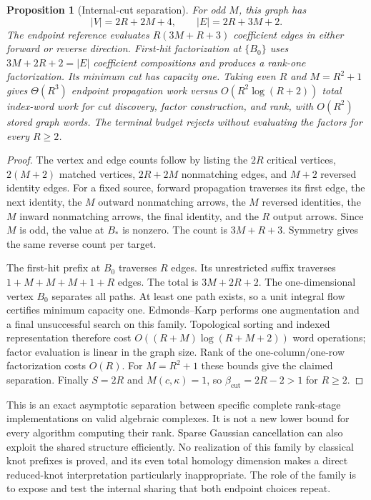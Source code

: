 \documentclass[11pt,letterpaper]{article}
\newtheorem{proposition}[theorem]{Proposition}
\theoremstyle{definition}\newtheorem{definition}[theorem]{Definition}
\theoremstyle{remark}\newtheorem{remark}[theorem]{Remark}
\newcommand{\cutlb}{\beta_{\mathrm{cut}}}
\begin{document}
\begin{proposition}[Internal-cut separation]\label{prop:separation}
For odd $M$, this graph has
\[
 |V|=2R+2M+4,\qquad |E|=2R+3M+2.
\]
The endpoint reference evaluates $R(3M+R+3)$ coefficient edges in either
forward or reverse direction. First-hit factorization at $\{B_0\}$ uses
$3M+2R+2=|E|$ coefficient compositions and produces a rank-one factorization.
Its minimum cut has capacity one. Taking even $R$ and $M=R^2+1$ gives
$\Theta(R^3)$ endpoint propagation work versus $O(R^2\log(R+2))$ total
index-word work for cut discovery, factor construction, and rank, with
$O(R^2)$ stored graph words. The terminal budget rejects without evaluating
the factors for every $R\geq2$.
\end{proposition}
\begin{proof}
The vertex and edge counts follow by listing the $2R$ critical vertices,
$2(M+2)$ matched vertices, $2R+2M$ nonmatching edges, and $M+2$ reversed
identity edges. For a fixed source, forward propagation traverses its first
edge, the next identity, the $M$ outward nonmatching arrows, the $M$ reversed
identities, the $M$ inward nonmatching arrows, the final identity, and the $R$
output arrows. Since $M$ is odd, the value at $B_\ast$ is nonzero. The
count is $3M+R+3$. Symmetry gives the same reverse count per target.

The first-hit prefix at $B_0$ traverses $R$ edges. Its unrestricted suffix
traverses $1+M+M+M+1+R$ edges. The total is $3M+2R+2$.
The one-dimensional vertex $B_0$ separates all paths. At least one path
exists, so a unit integral flow certifies minimum capacity one.
Edmonds--Karp performs one augmentation and a final unsuccessful search on
this family. Topological sorting and indexed representation therefore
cost $O((R+M)\log(R+M+2))$ word operations; factor evaluation is linear in
the graph size. Rank of the one-column/one-row factorization costs $O(R)$.
For $M=R^2+1$ these bounds give the claimed separation. Finally $S=2R$ and
$M(c,\kappa)=1$, so $\cutlb=2R-2>1$ for $R\geq2$.
\end{proof}

This is an exact asymptotic separation between specific complete rank-stage
implementations on valid algebraic complexes. It is not a new lower bound
for every algorithm computing their rank. Sparse Gaussian cancellation can
also exploit the shared structure efficiently. No realization of this
family by classical knot prefixes is proved, and its even total homology
dimension makes a direct reduced-knot interpretation particularly
inappropriate. The role of the family is to expose and test the internal
sharing that both endpoint choices repeat.
\end{document}
